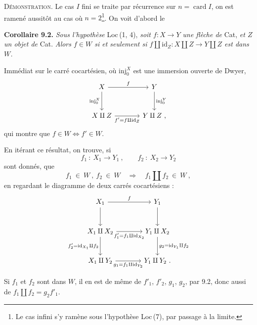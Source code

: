 \documentclass[11pt]{article}
\newcommand{\printedpage}[1]{\marginpar{\raggedright\footnotesize p.~#1}}
\newcommand{\msp}[1]{\marginpar{\raggedright\footnotesize [#1]}}
\newcommand{\id}{\mathrm{id}}
\newcommand{\inj}{\mathrm{inj}}
\begin{document}
\textsc{Démonstration}. Le cas $I$ fini se traite par récurrence sur $n=\operatorname{card}I$, on est ramené aussitôt au cas où $n=2$\footnote[46]{Le cas infini s'y ramène sous l'hypothèse Loc\,(7), par passage à la limite.}. On voit d'abord le

\msp{page 120}

\textbf{Corollaire 9.2.} \textit{Sous l'hypothèse} Loc\,(1, 4), \textit{soit $f : X\longrightarrow Y$ une flèche de} Cat, \textit{et $Z$ un objet de} Cat. \textit{Alors $f\in W$ si et seulement si $f\amalg\id_Z : X\amalg Z\longrightarrow Y\amalg Z$ est dans $W$.}

Immédiat sur le carré cocartésien, où $\inj_0^X$ est une immersion ouverte de Dwyer,
\[
\begin{tikzcd}[column sep=large, row sep=large]
X \arrow[r, "f"] \arrow[d, "\inj_0^X"'] & Y \arrow[d, "\inj_0^Y"] \\
X\amalg Z \arrow[r, "f'=f\amalg\id_Z"'] & Y\amalg Z\ ,
\end{tikzcd}
\]
qui montre que $f\in W\iff f'\in W$.

En itérant ce résultat, on trouve, si
\[
f_1\ :\ X_1\longrightarrow Y_1\ ,\qquad f_2\ :\ X_2\longrightarrow Y_2
\]
sont donnés, que
\[
f_1\ \in\ W\ ,\ f_2\ \in\ W\quad\Longrightarrow\quad f_1\amalg f_2\ \in\ W\ ,
\]
en regardant le diagramme de deux carrés cocartésiens :
\[
\begin{tikzcd}[column sep=large, row sep=large]
X_1 \arrow[r, "f"] \arrow[d] & Y_1 \arrow[d] \\ %
X_1\amalg X_2 \arrow[r, "f'_1=f_1\amalg\id_{X_2}"'] \arrow[d, "f'_2=\id_{X_1}\amalg f_2"'] & Y_1\amalg X_2 \arrow[d, "g_2=\id_{Y_1}\amalg f_2"] \\
X_1\amalg Y_2 \arrow[r, "g_1=f_1\amalg\id_{Y_2}"'] & Y_1\amalg Y_2\ .
\end{tikzcd}
\]

\printedpage{66}

Si $f_1$ et $f_2$ sont dans $W$, il en est de même de $f'_1$, $f'_2$, $g_1$, $g_2$, par 9.2, donc aussi de $f_1\amalg f_2=g_2f'_1$.

\msp{page 121}
\end{document}
